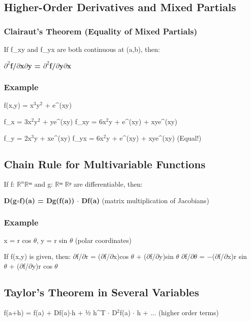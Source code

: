 \documentclass[12pt,a4paper,openany]{book}
\begin{document}
{{\subsection{Higher-Order Derivatives and Mixed Partials}

\subsubsection{Clairaut's Theorem (Equality of Mixed Partials) }
If f_xy and f_yx are both continuous at (a,b), then:

\textbf{$\partial^2$f/$\partial$x$\partial$y = $\partial^2$f/$\partial$y$\partial$x}

\subsubsection{Example}
f(x,y) = x$^3$y$^2$ + e^(xy)

f_x = 3x$^2$y$^2$ + ye^(xy)
f_xy = 6x$^2$y + e^(xy) + xye^(xy)

f_y = 2x$^3$y + xe^(xy)
f_yx = 6x$^2$y + e^(xy) + xye^(xy)  (Equal!)

\subsection{Chain Rule for Multivariable Functions}

If f: $\mathbb{R}^n\mathbb{R}$ᵐ and g: $\mathbb{R}$ᵐ  $\mathbb{R}$ᵖ are differentiable, then:

\textbf{D(g$\circ$f)(a) = Dg(f(a)) $\cdot$ Df(a)} (matrix multiplication of Jacobians)

\subsubsection{Example}
x = r cos $\theta$, y = r sin $\theta$ (polar coordinates)

If f(x,y) is given, then:
$\partial$f/$\partial$r = ($\partial$f/$\partial$x)cos $\theta$ + ($\partial$f/$\partial$y)sin $\theta$
$\partial$f/$\partial\theta$ = −($\partial$f/$\partial$x)r sin $\theta$ + ($\partial$f/$\partial$y)r cos $\theta$

\subsection{Taylor's Theorem in Several Variables}

f(a+h) = f(a) + Df(a)$\cdot$h + ½ h^T $\cdot$ D$^2$f(a) $\cdot$ h + ... (higher order terms)

}}
\end{document}
